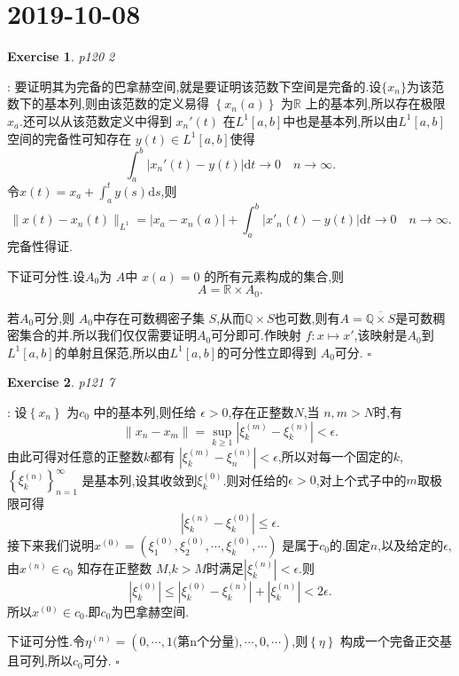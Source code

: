 \documentclass[a4paper]{article}
\newcommand\R{\ensuremath{\mathbb{R}}}
\newcommand\Q{\ensuremath{\mathbb{Q}}}
\newtheorem*{exe}{Exercise}
\newenvironment{sol}{{\noindent\bfseries Solution}:}{\hfill $\square$\par}
\begin{document}
\section{2019-10-08}
\begin{exe}
  p120 2	
\end{exe}
\begin{sol}
  要证明其为完备的巴拿赫空间,就是要证明该范数下空间是完备的.设$\{x_n\}$为该范数下的基本列,则由该范数的定义易得 $\left\{ x_n(a) \right\} $ 为$\R$ 上的基本列,所以存在极限$x_a$.还可以从该范数定义中得到 $x_n'(t)$ 在$L^1[a,b]$中也是基本列,所以由$L^1[a,b]$空间的完备性可知存在 $y(t)\in L^1[a,b]$使得
  \[
    \int_a^b \left| x_n'(t)-y(t) \right| \mathrm{d}t\to 0\quad n\to \infty
  .\] 
  令$x(t)=x_a+\int_a^t y(s)\mathrm{d}s$,则
  \[
    \|x(t)-x_n(t)\|_{L^1}= \left| x_a-x_n(a) \right| +\int_a^b\left| x'_n(t)-y(t) \right|\mathrm{d}t\to 0\quad n\to \infty 
  .\] 
  完备性得证.

  下证可分性.设$A_0$为 $A$中 $x(a)=0$ 的所有元素构成的集合,则
  \[
    A=\R\times A_0  
  .\]

若$A_0$可分,则 $A_0$中存在可数稠密子集 $S$,从而$\Q\times S$也可数,则有$A=\overline{\Q\times S}$是可数稠密集合的并.所以我们仅仅需要证明$A_0$可分即可.作映射 $f:x\mapsto x'$,该映射是$A_0$到 $L^1[a,b]$的单射且保范,所以由$L^1[a,b]$的可分性立即得到 $A_0$可分.
\end{sol}
\begin{exe}
  p121 7
\end{exe}
\begin{sol}
  设$\left\{ x_n \right\} $ 为$c_0$ 中的基本列,则任给 $\epsilon >0$,存在正整数$N$,当 $n,m>N$时,有
   \[
  \|x_n-x_m\|=\sup_{k\ge 1}\left| \xi^{(m)}_k-\xi^{(n)}_k \right|<\epsilon  
  .\] 
  由此可得对任意的正整数$k$都有 $\left| \xi^{(m)}_k-\xi^{(n)}_{n} \right| <\epsilon $,所以对每一个固定的$k$, $\left\{ \xi^{(n)}_k \right\}_{n=1}^{\infty} $ 是基本列,设其收敛到$\xi_k^{(0)}$.则对任给的$\epsilon >0$,对上个式子中的$m$取极限可得
   \[
  \left| \xi_k^{(n)}-\xi_k^{(0)} \right| \le \epsilon 
  .\]
  接下来我们说明$x^{(0)}=\left( \xi^{(0)}_1,\xi^{(0)}_2,\cdots,\xi^{(0)}_k,\cdots \right) $ 是属于$c_0$的.固定$n$,以及给定的$\epsilon $,由$x^{(n)}\in c_0$ 知存在正整数 $M$,$k>M$时满足$\left| \xi_k^{(n)} \right| <\epsilon $.则
  \[
  \left| \xi^{(0)}_k \right| \le \left| \xi^{(0)}_k-\xi^{(n)}_k \right| +\left| \xi^{(n)}_k \right| <2\epsilon 
  .\] 
  所以$x^{(0)}\in c_0$.即$c_0$为巴拿赫空间.
  
  下证可分性.令$\eta^{(n)}=\left( 0,\cdots,1\text{(第n个分量)},\cdots,0,\cdots \right) $,则$\left\{ \eta \right\} $ 构成一个完备正交基且可列,所以$c_0$可分.
\end{sol}
\end{document}
